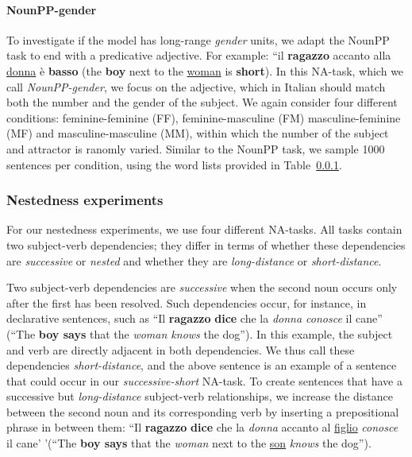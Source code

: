 \paragraph{NounPP-gender}
To investigate if the model has long-range \emph{gender} units, we adapt the NounPP task to end with a predicative adjective.
For example: ``il \textbf{ragazzo} accanto alla \underline{donna} \`{e} \textbf{basso} (the \textbf{boy} next to the \underline{woman} is \textbf{short}).
In this NA-task, which we call \emph{NounPP-gender}, we focus on the adjective, which in Italian should match both the number and the gender of the subject.
We again consider four different conditions: feminine-feminine (FF), feminine-masculine (FM) masculine-feminine (MF) and masculine-masculine (MM), within which the number of the subject and attractor is ranomly varied.
Similar to the NounPP task, we sample 1000 sentences per condition, using the word lists provided in Table~\ref{}.

\subsubsection{Nestedness experiments}

For our nestedness experiments, we use four different NA-tasks.
All tasks contain two subject-verb dependencies; they differ in terms of whether these dependencies are \emph{successive} or \emph{nested} and whether they are \emph{long-distance} or \emph{short-distance}.

Two subject-verb dependencies are \emph{successive} when the second noun occurs only after the first has been resolved. 
Such dependencies occur, for instance, in declarative sentences, such as ``Il \textbf{ragazzo} \textbf{dice} che la \textit{donna conosce} il cane'' (``The \textbf{boy says} that the \emph{woman knows} the dog'').
In this example, the subject and verb are directly adjacent in both dependencies.
We thus call these dependencies \emph{short-distance}, and the above sentence is an example of a sentence that could occur in our \emph{successive-short} NA-task. 
To create sentences that have a successive but \emph{long-distance} subject-verb relationships, we increase the distance between the second noun and its corresponding verb by inserting a prepositional phrase in between them: ``Il \textbf{ragazzo} \textbf{dice} che la \textit{donna} accanto al \underline{figlio} \textit{conosce} il cane' '(``The \textbf{boy says} that the \emph{woman} next to the \underline{son} \emph{knows} the dog'').

